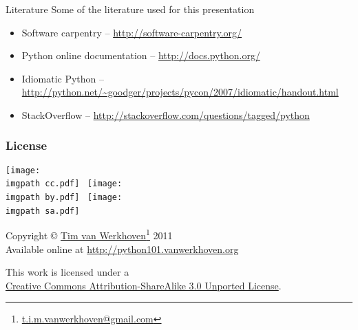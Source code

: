 \documentclass[xetex,10pt]{beamer}
\def\imgpath{../00-img/}
\def\spacer{\vspace*{1em}}
\begin{document}
\begin{frame}{Literature}
	Some of the literature used for this presentation
	\spacer
	\begin{itemize}
		\item Software carpentry -- \url{http://software-carpentry.org/}
		\item Python online documentation -- \url{http://docs.python.org/}
		\item Idiomatic Python -- \url{http://python.net/~goodger/projects/pycon/2007/idiomatic/handout.html}
		\item StackOverflow -- \url{http://stackoverflow.com/questions/tagged/python}
	\end{itemize}
	
\end{frame}

\begin{frame}
	\frametitle{License}

	\begin{center}
	\texttt{[image: \\imgpath cc.pdf]}~
	\texttt{[image: \\imgpath by.pdf]}~
	\texttt{[image: \\imgpath sa.pdf]}~
	
	\spacer
	
	Copyright © \href{http://work.vanwerkhoven.org/}{Tim van Werkhoven}\footnote[frame]{\url{t.i.m.vanwerkhoven@gmail.com}} 2011\\
	Available online at \url{http://python101.vanwerkhoven.org}
	
	\spacer
	
	This work is licensed under a\\
	\href{http://creativecommons.org/licenses/by-sa/3.0/}{Creative Commons Attribution-ShareAlike 3.0 Unported License}.

	\end{center}
	
\end{frame}
\end{document}
